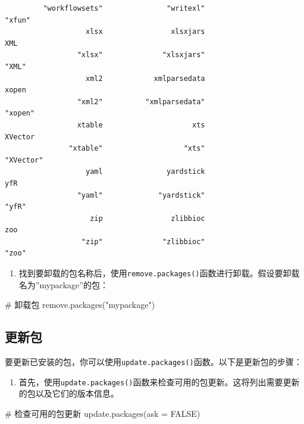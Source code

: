 \documentclass[
  letterpaper,
  DIV=11,
  numbers=noendperiod]{scrreprt}
\newenvironment{Shaded}{\begin{snugshade}}{\end{snugshade}}
\newcommand{\AttributeTok}[1]{\textcolor[rgb]{0.40,0.45,0.13}{#1}}
\newcommand{\CommentTok}[1]{\textcolor[rgb]{0.37,0.37,0.37}{#1}}
\newcommand{\ConstantTok}[1]{\textcolor[rgb]{0.56,0.35,0.01}{#1}}
\newcommand{\FunctionTok}[1]{\textcolor[rgb]{0.28,0.35,0.67}{#1}}
\newcommand{\NormalTok}[1]{\textcolor[rgb]{0.00,0.23,0.31}{#1}}
\newcommand{\StringTok}[1]{\textcolor[rgb]{0.13,0.47,0.30}{#1}}
\providecommand{\tightlist}{%
  \setlength{\itemsep}{0pt}\setlength{\parskip}{0pt}}\usepackage{longtable,booktabs,array}
\begin{document}
\begin{verbatim}
         "workflowsets"               "writexl"                  "xfun" 
                   xlsx                xlsxjars                     XML 
                 "xlsx"              "xlsxjars"                   "XML" 
                   xml2            xmlparsedata                   xopen 
                 "xml2"          "xmlparsedata"                 "xopen" 
                 xtable                     xts                 XVector 
               "xtable"                   "xts"               "XVector" 
                   yaml               yardstick                     yfR 
                 "yaml"             "yardstick"                   "yfR" 
                    zip                zlibbioc                     zoo 
                  "zip"              "zlibbioc"                   "zoo" 
\end{verbatim}

\begin{enumerate}
\def\labelenumi{\arabic{enumi}.}
\setcounter{enumi}{1}
\tightlist
\item
  找到要卸载的包名称后，使用\texttt{remove.packages()}函数进行卸载。假设要卸载名为''mypackage''的包：
\end{enumerate}

\begin{Shaded}
\begin{Highlighting}[]
\CommentTok{\# 卸载包}
\FunctionTok{remove.packages}\NormalTok{(}\StringTok{"mypackage"}\NormalTok{)}
\end{Highlighting}
\end{Shaded}

\hypertarget{ux66f4ux65b0ux5305}{%
\subsection{更新包}\label{ux66f4ux65b0ux5305}}

要更新已安装的包，你可以使用\texttt{update.packages()}函数。以下是更新包的步骤：

\begin{enumerate}
\def\labelenumi{\arabic{enumi}.}
\tightlist
\item
  首先，使用\texttt{update.packages()}函数来检查可用的包更新。这将列出需要更新的包以及它们的版本信息。
\end{enumerate}

\begin{Shaded}
\begin{Highlighting}[]
\CommentTok{\# 检查可用的包更新}
\FunctionTok{update.packages}\NormalTok{(}\AttributeTok{ask =} \ConstantTok{FALSE}\NormalTok{)}
\end{Highlighting}
\end{Shaded}
\end{document}
